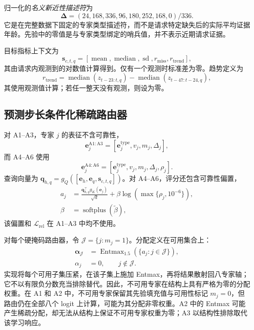 \documentclass[10pt,conference,letterpaper]{IEEEtran}
\begin{document}
归一化的\emph{名义新近性描述符}为
\begin{equation}
\boldsymbol\Delta=(24,168,336,96,180,252,168,0)/336.
\end{equation}
它是在完整数据下固定的专家类型描述符，而不是请求特定缺失后的实际平均证据年龄。先验中的零值是与专家类型绑定的哨兵值，并不表示近期请求证据。

目标指标上下文为
\begin{equation}
\mathbf s_{c,t,q}=[\operatorname{mean},\operatorname{median},\operatorname{sd},
r_{\mathrm{miss}},r_{\mathrm{trend}}],
\end{equation}
其由请求内观测到的对数值计算得到。仅有一个观测时标准差为零。趋势定义为
\begin{equation}
r_{\mathrm{trend}}=
\operatorname{median}(z_{t-23:t,q})-
\operatorname{median}(z_{t-47:t-24,q}),
\end{equation}
其使用观测值计算；若任一整天没有观测，则设为零。

\subsection{预测步长条件化稀疏路由器}
对 A1--A3，专家 $j$ 的表征不含可靠性，
\begin{equation}
\mathbf e^{\mathrm{A1:A3}}_j=[\mathbf e^{\mathrm{type}}_j,v_j,m_j,\Delta_j],
\end{equation}
而 A4--A6 使用
\begin{equation}
\mathbf e^{\mathrm{A4:A6}}_j=[\mathbf e^{\mathrm{type}}_j,v_j,m_j,\Delta_j,\rho_j].
\end{equation}
查询向量为 $\mathbf q_{h,q}=g_Q([\mathbf e_h,\mathbf e_q,\mathbf s_{c,t,q}])$。对 A4--A6，评分还包含可靠性偏置，
\begin{equation}
\begin{aligned}
a_j&=\frac{\mathbf q_{h,q}^{\top}g_K(\mathbf e_j)}{\sqrt d}
+\beta\log\!\left(\max\{\rho_j,10^{-6}\}\right),\\
\beta&=\operatorname{softplus}(\widetilde\beta),
\end{aligned}
\end{equation}
该偏置和 $\mathcal L_{\mathrm{rel}}$ 在 A1--A3 中均不使用。

对每个硬掩码路由器，令 $\mathcal J=\{j:m_j=1\}$。分配定义在可用集合上：
\begin{align}
\boldsymbol\alpha_{\mathcal J}
 &=\operatorname{Entmax}_{1.5}(\{a_j:j\in\mathcal J\}),\\
\alpha_j&=0,\qquad j\notin\mathcal J .
\end{align}
实现将每个可用子集压紧，在该子集上施加 Entmax，再将结果散射回八专家轴；它不以有限负分数充当排除替代。因此，不可用专家在结构上具有严格为零的分配权重。在 A1 和 A2 中，不可用专家保留其先验填充值与可用性标记 $m_j=0$，但路由仍在全部八个 logit 上计算，可能为其分配非零权重。A2 中的 Entmax 可能产生稀疏分配，却无法从结构上保证不可用专家权重为零；A3 以结构性排除取代该学习响应。
\end{document}
